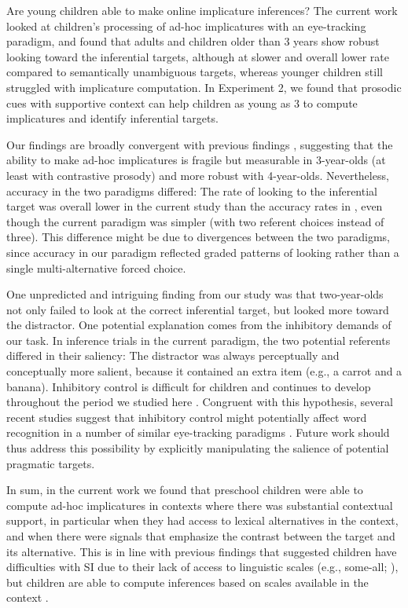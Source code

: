 \documentclass[10pt,letterpaper]{article}
\begin{document}
Are young children able to make online implicature inferences? The current work looked at children's processing of ad-hoc implicatures with an eye-tracking paradigm, and found that adults and children older than 3 years show robust looking toward the inferential targets, although at slower and overall lower rate compared to semantically unambiguous targets, whereas younger children still struggled with implicature computation. In Experiment 2, we found that prosodic cues with supportive context can help children as young as 3 to compute implicatures and identify inferential targets.

Our findings are broadly convergent with previous findings \cite{stillerLLD}, suggesting that the ability to make ad-hoc implicatures is fragile but measurable in 3-year-olds (at least with contrastive prosody) and more robust with 4-year-olds. Nevertheless, accuracy in the two paradigms differed: The rate of looking to the inferential target was overall lower in the current study than the accuracy rates in , even though the current paradigm was simpler (with two referent choices instead of three). This difference might be due to divergences between the two paradigms, since accuracy in our paradigm reflected graded patterns of looking rather than a single multi-alternative forced choice. 

One unpredicted and intriguing finding from our study was that two-year-olds not only failed to look at the correct inferential target, but looked more toward the distractor. One potential explanation comes from the inhibitory demands of our task. In inference trials in the current paradigm, the two potential referents differed in their saliency: The distractor was always perceptually and conceptually more salient, because it contained an extra item (e.g., a carrot and a banana). Inhibitory control is difficult for children and continues to develop throughout the period we studied here \cite{davidson2006development, gerardi2000sensitivity}. Congruent with this hypothesis, several recent studies suggest that inhibitory control might potentially affect word recognition in a number of similar eye-tracking paradigms \cite{yurovskybeyond,nordmeyer2013measuring}. Future work should thus address this possibility by explicitly manipulating the salience of potential pragmatic targets.

In sum, in the current work we found that preschool children were able to compute ad-hoc implicatures in contexts where there was substantial contextual support, in particular when they had access to lexical alternatives in the context, and when there were signals that emphasize the contrast between the target and its alternative. This is in line with previous findings that suggested children have difficulties with SI due to their lack of access to linguistic scales (e.g., some-all; ), but children are able to compute inferences based on scales available in the context \cite{stillerLLD}. 
\end{document}
